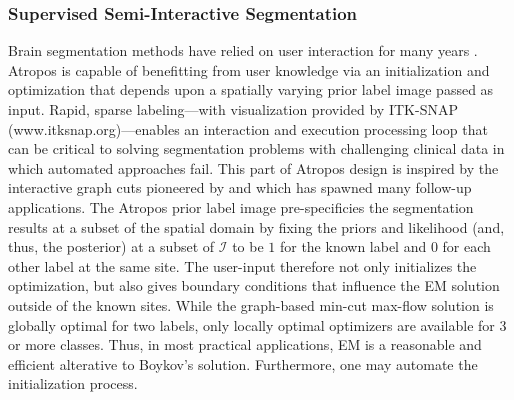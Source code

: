 \documentclass[11pt,english]{article}
\begin{document}
\subsubsection{Supervised Semi-Interactive Segmentation}
Brain segmentation methods have relied on user interaction for many
years \citep{Lim1989,Julin1997,Freeborough1997a,Yushkevich2006}.
Atropos is capable of benefitting from user knowledge via an
initialization and optimization that depends upon a spatially
varying prior label image passed as input.  Rapid, sparse
labeling---with visualization provided by ITK-SNAP
(www.itksnap.org)---enables an interaction and execution processing
loop that can be critical to solving segmentation problems with
challenging clinical data in which automated approaches fail.  This
part of Atropos design is inspired by the interactive graph cuts
pioneered by \cite{Boykov2001} and which has spawned many follow-up
applications.  The Atropos prior label
image pre-specificies the segmentation results at a subset of the
spatial domain by fixing the priors and likelihood (and, thus, the
posterior) at a subset of $\mathcal{I}$ to be $1$ for the known label
and $0$ for each other label at the same site.  The user-input
therefore not only initializes the optimization, but also gives boundary conditions
that influence the EM solution outside of the known sites.  While the
graph-based min-cut max-flow solution is globally optimal for two
labels, only locally optimal optimizers are available for 3 or more
classes.  Thus, in most practical applications, EM is a
reasonable and efficient alterative to Boykov's solution.
Furthermore, one may automate the
initialization process. 
\end{document}

